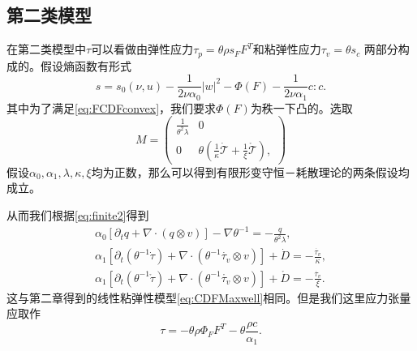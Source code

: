 \subsection{第二类模型}
在第二类模型中$\tau$可以看做由弹性应力$\tau_p = \theta \rho s_F F^T$和粘弹性应力$\tau_v=\theta s_c$
两部分构成的。假设熵函数有形式
\begin{equation*}
 	s = s_0(\nu,u) - \frac{1}{2 \nu \alpha_0} |w|^2 - \Phi (F)  - \frac{1}{2\nu \alpha_1}c:c .
\end{equation*}
其中为了满足\eqref{eq:FCDFconvex}，我们要求$\Phi(F)$为秩一下凸的。选取
\begin{equation*}
	M = \left( \begin{array}{ccc} 
			\frac{1}{\theta^2 \lambda} & 0 \\
			0 &  \theta(\frac{1}{\kappa} \dot{\mathcal{T}} + \frac{1}{\xi} \mathring{\mathcal{T}})  ,
		\end{array} \right)
\end{equation*}
假设$\alpha_0,\alpha_1,\lambda,\kappa,\xi$均为正数，那么可以得到有限形变守恒－耗散理论的两条假设均成立。

从而我们根据\eqref{eq:finite2}得到
	\begin{subequations}
		\begin{align*}
			\alpha_0 [\partial_t q +  \nabla \cdot (q \otimes v)] - \nabla \theta^{-1} = -\frac{q}{\theta^2 \lambda}, \\
			\alpha_1[\partial_t (\theta^{-1} \dot{\tau}) + \nabla \cdot (\theta^{-1} \dot{\tau_v} \otimes v)] + \dot{D} = -\frac{\dot{\tau_v}}{\kappa}, \\
			\alpha_1[\partial_t (\theta^{-1} \mathring{\tau}) + \nabla \cdot (\theta^{-1} \mathring{\tau_v} \otimes v)] + \mathring{D} = -\frac{\dot{\tau_v}}{\xi}. 
		\end{align*}
	\end{subequations}
这与第二章得到的线性粘弹性模型\eqref{eq:CDFMaxwell}相同。但是我们这里应力张量应取作
\begin{equation*}
	\tau = -\theta \rho \Phi_F F^T - \theta \frac{\rho c}{\alpha_1}.
\end{equation*}


